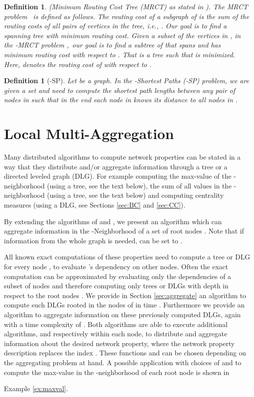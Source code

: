 \documentclass[11pt]{article}
\newtheorem{definition}[theorem]{Definition}
\newif\iffull
\newif\ifshort
\begin{document}
\begin{definition}\label{def:MRCT}(Minimum Routing Cost Tree (MRCT) as stated in \cite{WuLBCRT99} ).
The MRCT problem~\cite{WuLBCRT99} is defined as follows. The routing cost  of a subgraph  of  is the sum of the routing costs of all pairs of vertices in the tree, i.e., . Our goal is to find a spanning tree with minimum routing cost.
Given a subset  of the vertices  in , in the -MRCT problem  \cite{hochuli:holzer:MRCST},\ our goal is to find a subtree  of  that spans  and has minimum routing cost with respect to . That is a tree  such that  is minimized. Here,  denotes the routing cost of  with respect to .
\end{definition}

\begin{definition}[-SP]
 Let  be a graph. In the -Shortest Paths (-SP) problem, we are
given a set  and need to compute the shortest path lengths between any pair of nodes in  such that in the end each node in  knows its distance to all nodes in .
\end{definition}




\section{Local Multi-Aggregation}
\label{sec:aggAlgo}
Many distributed algorithms to compute network properties can be stated in a way that they distribute and/or aggregate information through a tree or a directed leveled graph (DLG). For example computing the max-value of the -neighborhood (using a tree, see the text below), the sum of all values in the -neighborhood (using a tree, see the text below) and computing centrality measures (using a DLG, see Sections \ref{sec:BC} and \ref{sec:CC}).

By extending the algorithms of \cite{holzer2012optimal} and \cite{hochuli:holzer:MRCST}, we present an algorithm which can aggregate information in the -Neighborhood of a set of root nodes . Note that if information from the whole graph is needed,  can be set to .

All known exact computations of these properties need to compute a tree or DLG for every node , to evaluate 's dependency on other nodes.
Often the exact computation can be approximated by evaluating only the dependencies of a subset  of nodes and therefore computing only  trees or DLGs with depth  in respect to the root nodes .
We provide in Section \ref{sec:aggregate} an algorithm to compute  such DLGs rooted in the nodes of  in time .
Furthermore we provide an algorithm to aggregate information on these previously computed DLGs, again with a time complexity of .
Both algorithms are able to execute additional algorithms,  and  respectively within each node, to distribute and aggregate information about the desired network property, where the network property description replaces the index . These functions  and  can be chosen depending on the aggregating problem at hand.
A possible application with choices of  and  to compute the max-value in the -neighborhood of each root node  is shown in 
\ifshort
Appendix \ref{FULL:sec:aggAlgo}, Example \ref{FULL:ex:maxval}.
\fi
\iffull
Example \ref{ex:maxval}.
\end{document}
